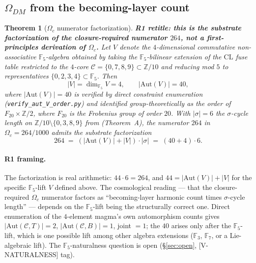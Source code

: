 \documentclass[11pt,reqno]{amsart}
\theoremstyle{plain}
\newtheorem{theorem}{Theorem}[section]
\theoremstyle{definition}
\theoremstyle{remark}
\newcommand{\Z}{\mathbb{Z}}
\newcommand{\F}{\mathbb{F}}
\newcommand{\Aut}{\mathrm{Aut}}
\begin{document}
\subsection{$\Omega_{DM}$ from the becoming-layer count}

\begin{theorem}[$\Omega_c$ numerator factorization]\label{thm:omega-dm-deriv}
\textbf{R1 retitle: this is the substrate factorization of the
closure-required numerator $264$, not a first-principles
derivation of $\Omega_c$.} Let $V$ denote the $4$-dimensional
commutative non-associative $\F_5$-algebra obtained by taking the
$\F_5$-bilinear extension of the $\mathrm{CL}$ fuse table
restricted to the $4$-core
$\mathcal{C} = \{0, 7, 8, 9\} \subset \Z/10$ and reducing mod $5$
to representatives $\{0, 2, 3, 4\} \subset \F_5$. Then
\[
  |V| = \dim_{\F_5} V = 4,\qquad |\Aut(V)| = 40,
\]
where $|\Aut(V)| = 40$ is verified by direct constraint enumeration
(\texttt{verify\_aut\_V\_order.py}) and identified group-theoretically
as the order of $F_{20} \times \Z/2$, where $F_{20}$ is the
Frobenius group of order $20$. With $|\sigma| = 6$ the
$\sigma$-cycle length on
$\Z/10 \setminus \{0, 3, 8, 9\}$ from
\cite{SandersGish2026SigmaRate} (Theorem~A), the numerator $264$
in $\Omega_c = 264/1000$ admits the substrate factorization
\[
  264 \;=\; (|\Aut(V)| + |V|) \cdot |\sigma| \;=\; (40 + 4) \cdot 6.
\]
\end{theorem}

\paragraph{R1 framing.} The factorization is real arithmetic:
$44 \cdot 6 = 264$, and $44 = |\Aut(V)| + |V|$ for the specific
$\F_5$-lift $V$ defined above. The cosmological reading --- that
the closure-required $\Omega_c$ numerator factors as ``becoming-layer
harmonic count times $\sigma$-cycle length'' --- depends on the
$\F_5$-lift being the structurally correct one. Direct enumeration
of the $4$-element magma's own automorphism counts gives
$|\Aut(\mathcal C, T)| = 2$, $|\Aut(\mathcal C, B)| = 1$, joint $= 1$;
the $40$ arises only after the $\F_5$-lift, which is one possible
lift among other algebra extensions ($\F_3$, $\F_7$, or a
Lie-algebraic lift). The $\F_5$-naturalness question is open
(\S\ref{sec:open}, [V-NATURALNESS] tag).

\end{document}
